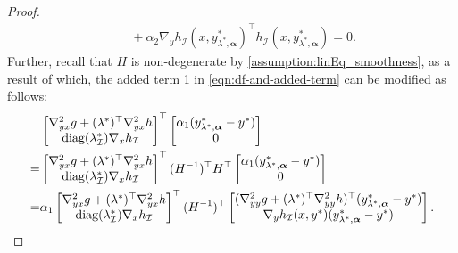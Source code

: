 \begin{proof}
\begin{align*}
    &\quad+ \alpha_2 \nabla_y h_\mathcal{I}(x,y_{\lambda^*,\boldsymbol{\alpha}}^*)^\top h_\mathcal{I}(x,y_{\lambda^*,\boldsymbol{\alpha}}^*) = 0. 
\end{align*}
Further, recall that $H$ is non-degenerate by \cref{assumption:linEq_smoothness}, as a result of which, the added term 1 in \cref{eqn:df-and-added-term} can be modified as follows: 
\begin{align}
    \footnotesize
    & \begin{bmatrix}
        \nabla^2_{yx} g + (\lambda^*)^\top \nabla_{yx}^2 h \\
        \text{diag}(\lambda^*_\mathcal{I}) \nabla_x h_\mathcal{I}
    \end{bmatrix}^\top \begin{bmatrix}
        \alpha_1 (y_{\lambda^*,\boldsymbol{\alpha}}^* - y^*) \\
        0
    \end{bmatrix} \nonumber \\
    = & \begin{bmatrix}
        \nabla^2_{yx} g + (\lambda^*)^\top \nabla_{yx}^2 h \\
        \text{diag}(\lambda^*_\mathcal{I}) \nabla_x h_\mathcal{I}
    \end{bmatrix}^\top (H^{-1})^\top  H^\top  \begin{bmatrix}
        \alpha_1 (y_{\lambda^*,\boldsymbol{\alpha}}^* - y^*) \\
        0
    \end{bmatrix} \nonumber \\
    = & \alpha_1 
    \begin{bmatrix}
        \nabla^2_{yx} g + (\lambda^*)^\top \nabla_{yx}^2 h \\
        \text{diag}(\lambda^*_\mathcal{I}) \nabla_x h_\mathcal{I}
    \end{bmatrix}^\top (H^{-1})^\top \begin{bmatrix}
        (\nabla^2_{yy} g + (\lambda^*)^\top \nabla_{yy}^2 h)^\top (y_{\lambda^*,\boldsymbol{\alpha}}^* - y^*) \\
        \nabla_y h_\mathcal{I}(x,y^*)(y_{\lambda^*,\boldsymbol{\alpha}}^* - y^*)
    \end{bmatrix}. \label{eqn:added_term}
\end{align}


\end{proof}
